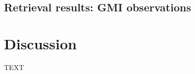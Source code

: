 \documentclass[amt, manuscript]{copernicus}
\begin{document}
\subsection{Retrieval results: GMI observations}

\section{Discussion}


\conclusions  %
TEXT












\appendix
\section{}    %

\subsection{}     %


\noappendix       %


\end{document}
